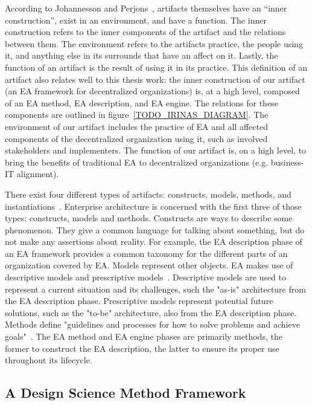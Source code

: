 According to Johannesson and Perjons~\cite{johannessonPerjons2012}, artifacts themselves have an ``inner construction'', exist in an environment, and have a function. The inner construction refers to the inner components of the artifact and the relations between them. The environment refers to the artifacts practice, the people using it, and anything else in its surrounds that have an affect on it. Lastly, the function of an artifact is the result of using it in its practice. This definition of an artifact also relates well to this thesis work: the inner construction of our artifact (an EA framework for decentralized organizations) is, at a high level, composed of an EA method, EA description, and EA engine. The relations for these components are outlined in figure~\ref{TODO_IRINAS_DIAGRAM}. The environment of our artifact includes the practice of EA and all affected components of the decentralized organization using it, such as involved stakeholders and implementers. The function of our artifact is, on a high level, to bring the benefits of traditional EA to decentralized organizations (e.g. business-IT alignment).


There exist four different types of artifacts: constructs, models, methods, and instantiations~\cite{hevner2004,johannessonPerjons2012}. Enterprise architecture is concerned with the first three of those types: constructs, models and methods. Constructs are ways to describe some phenomenon. They give a common language for talking about something, but do not make any assertions about reality. For example, the EA description phase of an EA framework provides a common taxonomy for the different parts of an organization covered by EA. Models represent other objects. EA makes use of descriptive models and prescriptive models~\cite{johannessonPerjons2012}. Descriptive models are used to represent a current situation and its challenges, such the "as-is" architecture from the EA description phase. Prescriptive models represent potential future solutions, such as the "to-be" architecture, also from the EA description phase. Methods define "guidelines and processes for how to solve problems and achieve goals"~\cite{johannessonPerjons2012}. The EA method and EA engine phases are primarily methods, the former to construct the EA description, the latter to ensure its proper use throughout its lifecycle. 

\subsection{A Design Science Method Framework}
\label{sec:framework}

